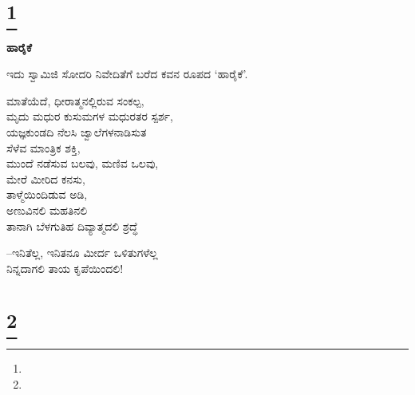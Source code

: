 \selecteng

\chapter[A BENEDICTION]{\protect\footnote{}}

\begin{myquote}
\end{myquote}

\selectkan

\begin{center}
\textbf{ಹಾರೈಕೆ}
\end{center}

\begin{center}
ಇದು ಸ್ವಾಮಿಜಿ ಸೋದರಿ ನಿವೇದಿತೆಗೆ ಬರೆದ ಕವನ ರೂಪದ ‘ಹಾರೈಕೆ’.
\end{center}

\begin{myquote}
ಮಾತೆಯೆದೆ, ಧೀರಾತ್ಮನಲ್ಲಿರುವ ಸಂಕಲ್ಪ,\\ಮೃದು ಮಧುರ ಕುಸುಮಗಳ ಮಧುರತರ ಸ್ಪರ್ಶ,\\ಯಜ್ಞಕುಂಡದಿ ನೆಲಸಿ ಜ್ವಾಲೆಗಳನಾಡಿಸುತ\\ಸೆಳೆವ ಮಾಂತ್ರಿಕ ಶಕ್ತಿ,\\ಮುಂದೆ ನಡೆಸುವ ಬಲವು, ಮಣಿವ ಒಲವು,\\ಮೇರೆ ಮೀರಿದ ಕನಸು,\\ತಾಳ್ಮೆಯಿಂದಿಡುವ ಅಡಿ,\\ಅಣುವಿನಲಿ ಮಹತಿನಲಿ\\ತಾನಾಗಿ ಬೆಳಗುತಿಹ ದಿವ್ಯಾತ್ಮದಲಿ ಶ್ರದ್ಧೆ
\end{myquote}

\begin{myquote}
–ಇನಿತೆಲ್ಲ, ಇನಿತನೂ ಮೀರ್ದ ಒಳಿತುಗಳೆಲ್ಲ\\ನಿನ್ನದಾಗಲಿ ತಾಯ ಕೃಪೆಯಿಂದಲಿ!
\end{myquote}

\selecteng

\chapter[REQUIESCAT IN PACE]{\protect\footnote{}}

